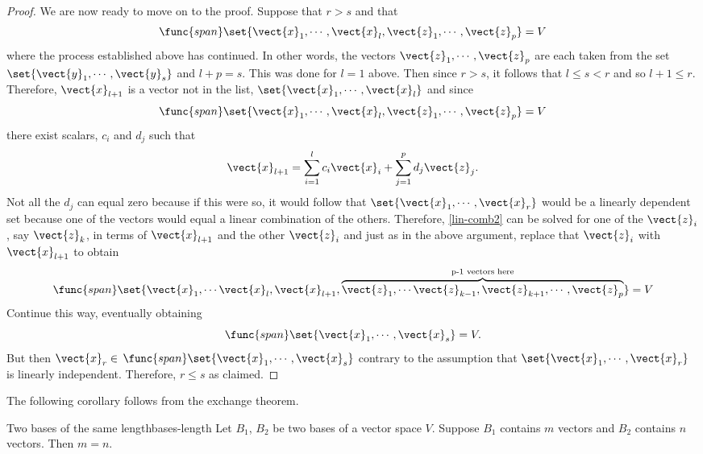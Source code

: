 \begin{proof}
We are now ready to move on to the proof. Suppose that $r>s$ and that 
\[
\func{span}\set{\vect{x}_{1},\cdots ,
\vect{x}_{l},\vect{z}_{1},\cdots ,\vect{z}_{p}} =V
\]
 where the process established above has continued. In other words, the vectors $\vect{z}_{1},\cdots ,\vect{z}_{p}$ are each taken from the
set $\set{\vect{y}_{1},\cdots ,\vect{y}_{s}} $ and $l+p=s$.
This was done for $l=1$ above. Then since $r>s$, it follows that $
l\leq s<r$ and so $l+1\leq r$. Therefore, $\vect{x}_{l+1}$ is a vector not
in the list, $\set{\vect{x}_{1},\cdots ,\vect{x}_{l}} $ and
since 
\[
\func{span}\set{\vect{x}_{1},\cdots ,\vect{x}_{l},\vect{z}
_{1},\cdots ,\vect{z}_{p}} =V
\]
 there exist scalars, $c_{i}$ and $
d_{j}$ such that 
\begin{equation}
\vect{x}_{l+1}=\sum_{i=1}^{l}c_{i}\vect{x}_{i}+\sum_{j=1}^{p}d_{j}
\vect{z}_{j}.  \label{lin-comb2}
\end{equation}
Not all the $d_{j}$ can equal zero because if this were so, it would follow
that $\set{\vect{x}_{1},\cdots ,\vect{x}_{r}} $ would be a
linearly dependent set because one of the vectors would equal a linear
combination of the others. Therefore, \ref{lin-comb2} can be solved for one of the 
$\vect{z}_{i}$, say $\vect{z}_{k}$, in terms of $\vect{x}_{l+1}$ and
the other $\vect{z}_{i}$ and just as in the above argument, replace that $
\vect{z}_{i}$ with $\vect{x}_{l+1}$ to obtain 
\begin{equation*}
\func{span}\set{\vect{x}_{1},\cdots \vect{x}_{l},\vect{x}_{l+1},
\overset{\text{p-1 vectors here}}{\overbrace{\vect{z}_{1},\cdots \vect{z}
_{k-1},\vect{z}_{k+1},\cdots ,\vect{z}_{p}}}} =V
\end{equation*}
Continue this way, eventually obtaining 
\begin{equation*}
\func{span}\set{\vect{x}_{1},\cdots ,\vect{x}_{s}} =V.
\end{equation*}
But then $\vect{x}_{r}\in $ $\func{span}\set{\vect{x}_{1},\cdots ,
\vect{x}_{s}} $ contrary to the assumption that $\set{\vect{x}
_{1},\cdots ,\vect{x}_{r}} $ is linearly independent. Therefore, $
r\leq s$ as claimed.
\end{proof}

The following corollary follows from the exchange theorem.

\begin{corollary}{Two bases of the same length}{bases-length}
Let $B_1$, $B_2$ be two bases of a vector space $V$. Suppose $B_1$ contains $m$ vectors and $B_2$ contains $n$ vectors. Then $m = n$.
\end{corollary}

